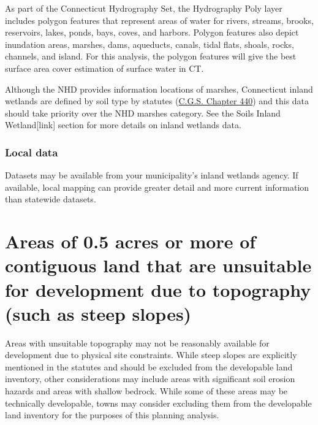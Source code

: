 \documentclass[
  letterpaper,
  DIV=11,
  numbers=noendperiod]{scrreprt}
\begin{document}
As part of the Connecticut Hydrography Set, the Hydrography Poly layer
includes polygon features that represent areas of water for rivers,
streams, brooks, reservoirs, lakes, ponds, bays, coves, and harbors.
Polygon features also depict inundation areas, marshes, dams, aqueducts,
canals, tidal flats, shoals, rocks, channels, and island. For this
analysis, the polygon features will give the best surface area cover
estimation of surface water in CT.

\begin{tcolorbox}[enhanced jigsaw, arc=.35mm, bottomrule=.15mm, breakable, colback=white, colframe=quarto-callout-note-color-frame, left=2mm, leftrule=.75mm, opacityback=0, rightrule=.15mm, toprule=.15mm]
\begin{minipage}[t]{5.5mm}
\textcolor{quarto-callout-note-color}{\faInfo}
\end{minipage}%
\begin{minipage}[t]{\textwidth - 5.5mm}

Although the NHD provides information locations of marshes, Connecticut
inland wetlands are defined by soil type by statutes
(\href{https://www.cga.ct.gov/2019/pub/chap_440.htm}{C.G.S. Chapter
440}) and this data should take priority over the NHD marshes category.
See the Soils Inland Wetland{[}link{]} section for more details on
inland wetlands data.

\end{minipage}%
\end{tcolorbox}

\subsubsection{Local data}\label{sec-local-data3}

Datasets may be available from your municipality's inland wetlands
agency. If available, local mapping can provide greater detail and more
current information than statewide datasets.

\section{Areas of 0.5 acres or more of contiguous land that are
unsuitable for development due to topography (such as steep
slopes)}\label{areas-of-0.5-acres-or-more-of-contiguous-land-that-are-unsuitable-for-development-due-to-topography-such-as-steep-slopes}

Areas with unsuitable topography may not be reasonably available for
development due to physical site constraints. While steep slopes are
explicitly mentioned in the statutes and should be excluded from the
developable land inventory, other considerations may include areas with
significant soil erosion hazards and areas with shallow bedrock. While
some of these areas may be technically developable, towns may consider
excluding them from the developable land inventory for the purposes of
this planning analysis.
\end{document}
